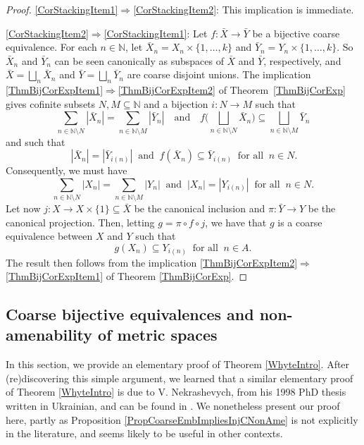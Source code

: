 \documentclass[11pt]{amsart}
\newcommand{\N}{\mathbb{N}}
\numberwithin{equation}{section}
\theoremstyle{definition}
\theoremstyle{remark}
\numberwithin{equation}{section}
\begin{document}
\begin{proof}
\eqref{CorStackingItem1}$\Rightarrow$\eqref{CorStackingItem2}: This implication is immediate. 

\eqref{CorStackingItem2}$\Rightarrow$\eqref{CorStackingItem1}: Let $f\colon \bar X\to \bar Y$ be a bijective coarse equivalence. For each $n\in\N$, let $\bar X_n=X_n\times \{1,\ldots, k\}$ and $\bar Y_n=Y_n\times \{1,\ldots, k\}$. So $\bar X_n$ and $\bar Y_n$ can be seen canonically as subspaces of $\bar X$ and $\bar Y$, respectively, and $\bar X=\bigsqcup_n\bar X_n$ and $\bar Y=\bigsqcup_n\bar Y_n$ are coarse disjoint unions. The implication \eqref{ThmBijCorExpItem1}$\Rightarrow$\eqref{ThmBijCorExpItem2} of Theorem~\ref{ThmBijCorExp} gives cofinite subsets $N,M\subseteq \N$ and a bijection $i\colon N\to M$ such that 
\[
\sum_{n\in \N\setminus N}|\bar X_n|=\sum_{n\in \N\setminus M}|\bar Y_n| \quad \text{and} \quad f\Bigg(\bigsqcup_{n\in \N\setminus N} \bar X_n\Bigg)\subseteq \bigsqcup_{n\in \N\setminus M} \bar Y_n 
\]
 and such that 
 \[
 \ |\bar X_n|=|\bar Y_{i(n)}|\ \text{ and }\ f(\bar X_n)\subseteq \bar Y_{i(n)}
\ \text{ for all }\ n\in N.
\]
Consequently, we must have 
\[
\sum_{n\in \N\setminus N}| X_n|=\sum_{n\in \N\setminus M}| Y_n|\ \text{ and }\ | X_n|=| Y_{i(n)}|\ \text{ for all }\ n\in N.
 \]
Let now $j\colon X\to X\times \{1\}\subseteq \bar X$ be the canonical inclusion and $\pi\colon \bar Y\to Y$ be the canonical projection. Then, letting $g=\pi\circ f\circ j$, we have that $g$ is a coarse equivalence between $X$ and $Y$ such that 
\[
g(X_n)\subseteq Y_{i(n)}\ \text{ for all }\ n\in A.
\]
The result then follows from the implication \eqref{ThmBijCorExpItem2}$\Rightarrow$\eqref{ThmBijCorExpItem1} of Theorem
\ref{ThmBijCorExp}.
\end{proof}
 
\subsection{Coarse bijective equivalences and non-amenability of metric spaces} 

In this section, we provide an elementary proof of Theorem \ref{WhyteIntro}.  After (re)discovering this simple argument, we learned that a similar elementary proof of Theorem \ref{WhyteIntro} is due to V. Nekrashevych, from his 1998 PhD thesis written in Ukrainian, and can be found in \cite[IV.B-46]{Harpe2000book}.  We nonetheless present our proof here, partly as Proposition \ref{PropCoarseEmbImpliesInjCNonAme} is not explicitly in the literature, and seems likely to be useful in other contexts.
\end{document}
